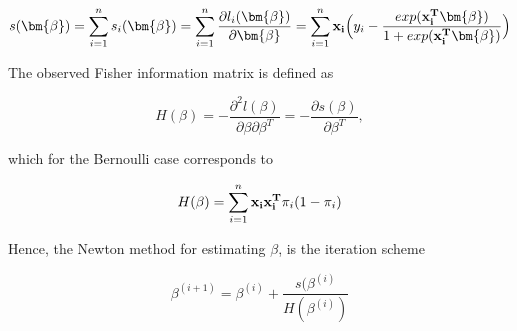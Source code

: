 \begin{equation}
\label{eq:score}
s(\bm{\beta}) = \sum_{i=1}^{n}s_i(\bm{\beta}) = \sum_{i=1}^{n} \frac{\partial l_i(\bm{\beta})}{\partial \bm{\beta}} = \sum_{i=1}^{n} {\bf x_i} \Big ( y_i - \frac{exp({\bf x_i^T} \bm{ \beta})}{1 + exp({\bf x_i^T} \bm{ \beta})}\Big )
\end{equation}

The observed Fisher information matrix is defined as 

\begin{equation}
    H(\beta) = - \frac{\partial^2 l(\beta)}{\partial \beta \partial \beta^T} = -\frac{\partial s(\beta)}{\partial \beta^T},
\end{equation}

which for the Bernoulli case corresponds to

\begin{equation}
    H(\beta) = \sum_{i=1}^{n} {\bf x_i x_i^T} \pi_i (1-\pi_i)
\end{equation}

Hence, the Newton method for estimating $\beta$, is the iteration scheme

\begin{equation}
\label{eq:Newton}
    \beta^{(i+1)} = \beta^{(i)} + \frac{s(\beta^{(i)}}{H(\beta^{(i)})}
\end{equation}









